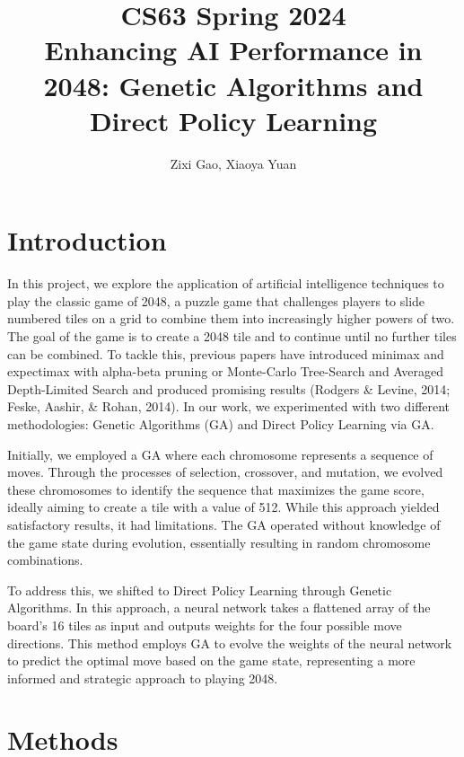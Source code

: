 \documentclass[11pt]{article}
\title{CS63 Spring 2024\\Enhancing AI Performance in 2048: Genetic Algorithms and\\ Direct Policy Learning}
\author{Zixi Gao, Xiaoya Yuan}
\date{}
\begin{document}
\maketitle

\section{Introduction}


In this project, we explore the application of artificial intelligence techniques to play the classic game of 2048, a puzzle game that challenges players to slide numbered tiles on a grid to combine them into increasingly higher powers of two. The goal of the game is to create a 2048 tile and to continue until no further tiles can be combined. To tackle this, previous papers have introduced minimax and expectimax with alpha-beta pruning or Monte-Carlo Tree-Search and Averaged Depth-Limited Search and produced promising results (Rodgers \& Levine, 2014; Feske, Aashir, \& Rohan, 2014). In our work, we experimented with two different methodologies: Genetic Algorithms (GA) and Direct Policy Learning via GA.

Initially, we employed a GA where each chromosome represents a sequence of moves. Through the processes of selection, crossover, and mutation, we evolved these chromosomes to identify the sequence that maximizes the game score, ideally aiming to create a tile with a value of 512. While this approach yielded satisfactory results, it had limitations. The GA operated without knowledge of the game state during evolution, essentially resulting in random chromosome combinations.

To address this, we shifted to Direct Policy Learning through Genetic Algorithms. In this approach, a neural network takes a flattened array of the board's 16 tiles as input and outputs weights for the four possible move directions. This method employs GA to evolve the weights of the neural network to predict the optimal move based on the game state, representing a more informed and strategic approach to playing 2048.

\section{Methods}
\end{document}
